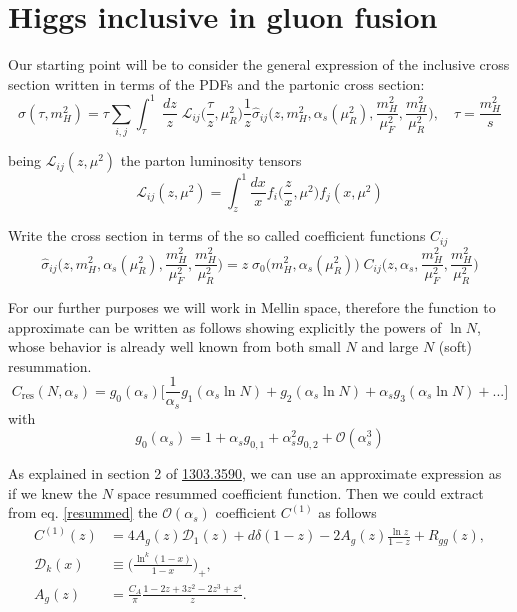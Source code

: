 \documentclass[12pt]{article}
\begin{document}
\section{Higgs inclusive in gluon fusion}

Our starting point will be to consider the general expression of the inclusive cross section written in terms of the PDFs and the partonic cross section:
\begin{equation}
	\sigma(\tau, m_{H}^{2}) = \tau \sum_{i,j} \int_{\tau}^{1} \; \frac{dz}{z} \;
	\mathcal{L}_{ij} \bigg(\frac{\tau}{z}, \mu_{R}^{2} \bigg) \frac{1}{z} \hat{\sigma}_{ij} \Bigg(z, m_{H}^{2}, \alpha_{s}(\mu_{R}^{2}), \frac{m_{H}^{2}}{\mu_{F}^{2}},  \frac{m_{H}^{2}}{\mu_{R}^{2}} \Bigg), \quad \tau = \frac{m_{H}^{2}}{s}
\end{equation}

being $\mathcal{L}_{ij}(z, \mu^{2})$ the parton luminosity tensors
\begin{equation}
	\mathcal{L}_{ij} (z, \mu^{2}) = \int_{z}^{1} \frac{dx}{x} f_{i}\bigg( \frac{z}{x}, \mu^{2} \bigg) f_{j}(x, \mu^{2})
\end{equation}

Write the cross section in terms of the so called coefficient functions $C_{ij}$
\begin{equation}
	\hat{\sigma}_{ij}\Bigg(z, m_{H}^{2}, \alpha_{s}(\mu_{R}^{2}), \frac{m_{H}^{2}}{\mu_{F}^{2}}, \frac{m_{H}^{2}}{\mu_{R}^{2}} \Bigg) = z \; \sigma_{0} \big(m_{H}^{2}, \alpha_s(\mu_{R}^{2}) \big) \; C_{ij} \Bigg(z, \alpha_{s},  \frac{m_{H}^{2}}{\mu_{F}^{2}}, \frac{m_{H}^{2}}{\mu_{R}^{2}} \Bigg)
\end{equation}

For our further purposes we will work in Mellin space, therefore the function to approximate can be written as follows showing explicitly the powers of $\ln N$, whose behavior is already well known from both small $N$ and large $N$ (soft) resummation.
\begin{equation}
	C_{\textrm{res}}(N, \alpha_{s}) = g_{0}(\alpha_{s}) \Bigg[\frac{1}{\alpha_{s}} g_{1}(\alpha_{s} \ln N) + g_{2}(\alpha_{s} \ln N) + \alpha_{s} g_{3} (\alpha_{s} \ln N) + ...\Bigg]
	\label{resummed}
\end{equation}
with
\begin{equation}
	g_{0}(\alpha_{s}) = 1 + \alpha_{s}g_{0, 1} + \alpha_{s}^{2} g_{0, 2} + \mathcal{O}(\alpha_{s}^{3})
\end{equation}

As explained in section 2 of \href{https://arxiv.org/abs/1303.3590}{1303.3590}, we can use an approximate expression as if we knew the $N$ space resummed coefficient function. Then we could extract from eq. \eqref{resummed} the $\mathcal{O}(\alpha_{s})$ coefficient $C^{(1)}$ as follows
\begin{align}
		C^{(1)}(z) &= 4 A_{g}(z) \mathcal{D}_{1}(z) + d \delta(1 - z) - 2 A_{g}(z)\frac{\ln z}{1-z} + R_{gg}(z), \\
		\mathcal{D}_{k}(x) &\equiv \Bigg( \frac{\ln^{k}(1 - x)}{1 - x} \Bigg)_{+},\\
		A_{g}(z) &= \frac{C_{A}}{\pi} \frac{1 - 2 z + 3 z^{2} - 2 z^{3} + z^{4}}{z}.
\end{align}
\end{document}
